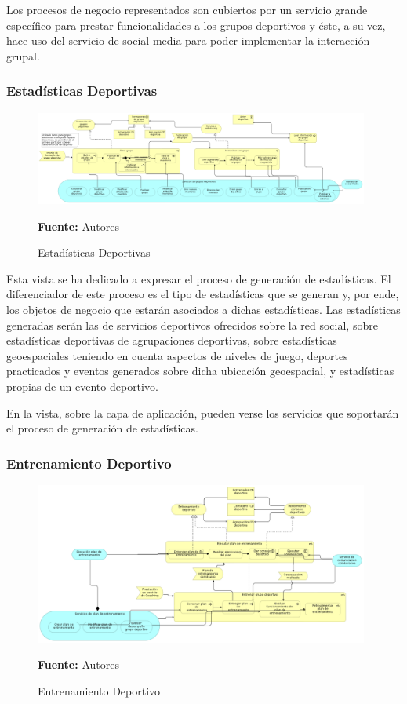 Los procesos de negocio representados son cubiertos por un servicio grande específico para prestar funcionalidades a los grupos deportivos y éste, a su vez, hace uso del servicio de social media para poder implementar la interacción grupal.

\subsubsection{Estadísticas Deportivas}

\begin{figure}[!htb]
  \begin{center}
    \includegraphics[width=11cm]{./imagenes/business_process/estadisticasdeportivas.png}
    \caption{Estadísticas Deportivas}
    \label{fig:bp_estadisticas_deportivo}
    \textbf{Fuente:}  Autores
  \end{center}
\end{figure}

Esta vista se ha dedicado a expresar el proceso de generación de estadísticas. El diferenciador de este proceso es el tipo de estadísticas que se generan y, por ende, los objetos de negocio que estarán asociados a dichas estadísticas. Las estadísticas generadas serán las de servicios deportivos ofrecidos sobre la red social, sobre estadísticas deportivas de agrupaciones deportivas, sobre estadísticas geoespaciales teniendo en cuenta aspectos de niveles de juego, deportes practicados y eventos generados sobre dicha ubicación geoespacial, y estadísticas propias de un evento deportivo.

En la vista, sobre la capa de aplicación, pueden verse los servicios que soportarán el proceso de generación de estadísticas.

\subsubsection{Entrenamiento Deportivo}

\begin{figure}[!htb]
  \begin{center}
    \includegraphics[width=11cm]{./imagenes/business_process/entrenamientodeportivo.png}
    \caption{Entrenamiento Deportivo}
    \label{fig:bp_entrenamiento_deportivo}
    \textbf{Fuente:}  Autores
  \end{center}
\end{figure}


